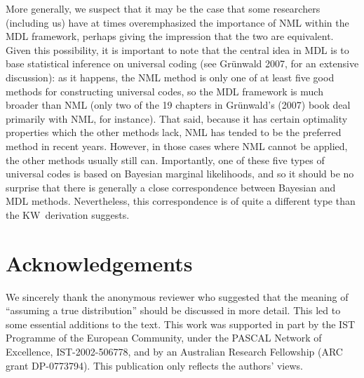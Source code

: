 \documentclass[authoryear]{elsarticle}
\newcommand{\kw}{KW}
\begin{document}
More generally, we suspect that it may be the case that
some researchers (including us)
have at times overemphasized the importance of NML within the MDL framework,
perhaps giving the impression that the two are equivalent.
Given this possibility, it is important to note that the central
idea in MDL is to base statistical inference on universal coding
(see Gr\"unwald 2007, for an extensive discussion): as it happens,
the NML method is only one of at least five good methods for constructing
universal codes, so the MDL framework is much broader than NML
(only two of the 19 chapters in Gr\"unwald's (2007) book deal primarily
with NML, for instance).  That said, because it has certain optimality
properties which the other methods lack, NML has tended to be the
preferred method in recent years. However, in those cases
where NML cannot be applied, the other methods usually still can.
Importantly, one of these five types of universal codes is based
on Bayesian marginal likelihoods, and so it should be no surprise that
there is generally a close correspondence between Bayesian and MDL methods.
Nevertheless, this correspondence is of quite a different type than
the \kw\ derivation suggests.

\section{Acknowledgements}
We sincerely thank the anonymous reviewer who suggested that the meaning of ``assuming a true
distribution'' should be discussed in more detail. This led to some
essential additions to the text. This work was
supported in part by the IST Programme of the European Community,
under the PASCAL Network of Excellence, IST-2002-506778, and
by an Australian Research Fellowship (ARC grant DP-0773794).
This publication only reflects the authors' views.
\end{document}
